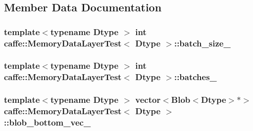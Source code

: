\subsection{Member Data Documentation}
\hypertarget{classcaffe_1_1_memory_data_layer_test_adf80053b8c93a68ec14207ed114bbf6c}{
\subsubsection[{batch\+\_\+size\+\_\+}]{\setlength{\rightskip}{0pt plus 5cm}template$<$typename Dtype $>$ int {\bf caffe\+::\+Memory\+Data\+Layer\+Test}$<$ Dtype $>$\+::batch\+\_\+size\+\_\+\hspace{0.3cm}{\ttfamily [protected]}}}\label{classcaffe_1_1_memory_data_layer_test_adf80053b8c93a68ec14207ed114bbf6c}
\hypertarget{classcaffe_1_1_memory_data_layer_test_ab5cdf08e300fc8ee97762b510403ea1d}{
\subsubsection[{batches\+\_\+}]{\setlength{\rightskip}{0pt plus 5cm}template$<$typename Dtype $>$ int {\bf caffe\+::\+Memory\+Data\+Layer\+Test}$<$ Dtype $>$\+::batches\+\_\+\hspace{0.3cm}{\ttfamily [protected]}}}\label{classcaffe_1_1_memory_data_layer_test_ab5cdf08e300fc8ee97762b510403ea1d}
\hypertarget{classcaffe_1_1_memory_data_layer_test_abd3b727ea9e820961deab300840f65a8}{
\subsubsection[{blob\+\_\+bottom\+\_\+vec\+\_\+}]{\setlength{\rightskip}{0pt plus 5cm}template$<$typename Dtype $>$ vector$<${\bf Blob}$<$Dtype$>$$\ast$$>$ {\bf caffe\+::\+Memory\+Data\+Layer\+Test}$<$ Dtype $>$\+::blob\+\_\+bottom\+\_\+vec\+\_\+\hspace{0.3cm}{\ttfamily [protected]}}}\label{classcaffe_1_1_memory_data_layer_test_abd3b727ea9e820961deab300840f65a8}
